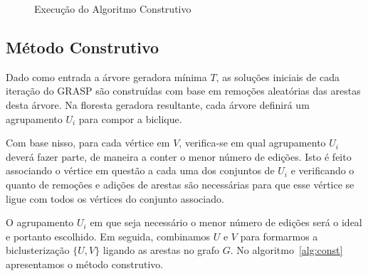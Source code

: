 \documentclass[article]{rian_article}
\begin{document}
\begin{figure}[hbtp]
\caption{Execução do Algoritmo Construtivo}
\label{fig:construtivo}
\end{figure}

\subsection{Método Construtivo} \label{sec::construtivo}

Dado como entrada a árvore geradora mínima $T$, as soluções iniciais de cada iteração do GRASP são construídas com base em remoções aleatórias das arestas desta árvore.
Na floresta geradora resultante, cada árvore definirá um agrupamento $U_i$ para compor a biclique.

Com base nisso, para cada vértice em $V$, verifica-se em qual agrupamento $U_i$ deverá fazer parte, de maneira a conter o menor número de edições.
Isto é feito associando o vértice em questão a cada uma dos conjuntos de $U_i$ e verificando o quanto de remoções e adições de arestas são necessárias para que esse vértice se ligue com todos os vértices do conjunto associado.

O agrupamento $U_i$ em que seja necessário o menor número de edições será o ideal e portanto escolhido.
Em seguida, combinamos $U$ e $V$ para formarmos a biclusterização $\{U,V\}$ ligando as arestas no grafo $G$.
No algoritmo~\ref{alg:const} apresentamos o método construtivo.
\end{document}
